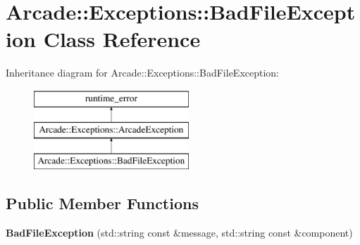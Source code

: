 \hypertarget{classArcade_1_1Exceptions_1_1BadFileException}{}\section{Arcade\+::Exceptions\+::Bad\+File\+Exception Class Reference}
\label{classArcade_1_1Exceptions_1_1BadFileException}
Inheritance diagram for Arcade\+::Exceptions\+::Bad\+File\+Exception\+:\begin{figure}[H]
\begin{center}
\leavevmode
\includegraphics[height=3.000000cm]{classArcade_1_1Exceptions_1_1BadFileException}
\end{center}
\end{figure}
\subsection*{Public Member Functions}
\begin{DoxyCompactItemize}
\item 
\mbox{\label{classArcade_1_1Exceptions_1_1BadFileException_a63947677061a2e9e28cd0dea967a3a0b}} 
{\bfseries Bad\+File\+Exception} (std\+::string const \&message, std\+::string const \&component)
\end{DoxyCompactItemize}
